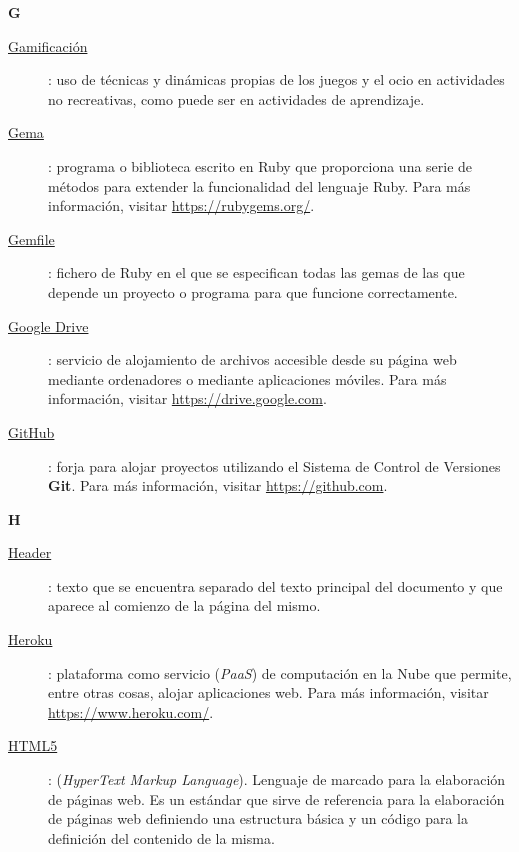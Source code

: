 {\bfseries {\Huge G}}\label{Apendice1:G}
\bigskip
\bigskip

\begin{description}
  \item[\underline{Gamificaci\'on}\label{apend1:gamificacion}]: uso de t\'ecnicas y din\'amicas propias de los juegos y el ocio en actividades no recreativas, como puede ser en actividades de 
  aprendizaje.
  \bigskip

  \item[\underline{Gema}\label{apend1:gema}]: programa o biblioteca escrito en Ruby que proporciona una serie de m\'etodos para extender la funcionalidad del lenguaje Ruby. Para m\'as 
  informaci\'on, visitar {\small \url{https://rubygems.org/}}.
  \bigskip

  \item[\underline{Gemfile}\label{apend1:gemfile}]: fichero de Ruby en el que se especifican todas las gemas de las que depende un proyecto o programa para que funcione correctamente.
  \bigskip

  \item[\underline{Google Drive}\label{apend1:drive}]: servicio de alojamiento de archivos accesible desde su p\'agina web mediante ordenadores o mediante aplicaciones m\'oviles. Para m\'as 
  informaci\'on, visitar {\small \url{https://drive.google.com}}.
  \bigskip

  \item[\underline{GitHub}\label{apend1:github}]: forja para alojar proyectos utilizando el Sistema de Control de Versiones {\bfseries Git}. Para m\'as informaci\'on, visitar {\small 
  \url{https://github.com}}.
  \bigskip
\end{description}

\bigskip
{\bfseries {\Huge H}}\label{Apendice1:H}
\bigskip
\bigskip

\begin{description}
  \item[\underline{Header}\label{apend1:header}]: texto que se encuentra separado del texto principal del documento y que aparece al comienzo de la p\'agina del mismo.
  \bigskip

  \item[\underline{Heroku}\label{apend1:heroku}]: plataforma como servicio (\textit{PaaS}) de computaci\'on en la Nube que permite, entre otras cosas, alojar aplicaciones web. Para m\'as 
  informaci\'on, visitar {\small \url{https://www.heroku.com/}}.
  \bigskip

  \item[\underline{HTML5}\label{apend1:html}]: (\textit{HyperText Markup Language}). Lenguaje de marcado para la elaboraci\'on de p\'aginas web. Es un est\'andar que sirve de referencia para la 
  elaboraci\'on de p\'aginas web definiendo una estructura b\'asica y un c\'odigo para la definici\'on del contenido de la misma.
  \bigskip
\end{description}

